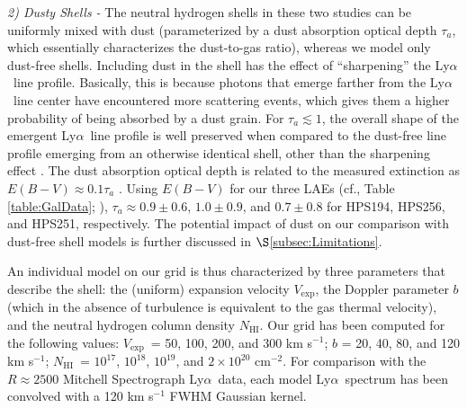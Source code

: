 \documentclass{emulateapj}
\newcommand{\lya}{Ly$\alpha$}
\def\nh{$N_{\mathrm{HI}}$}
\def\vexp{$V_{\mathrm{exp}}$}
\begin{document}
\textit{2) Dusty Shells -} The neutral hydrogen shells in these two studies can be uniformly mixed with dust (parameterized by a dust absorption optical depth $\tau_{a}$, which essentially characterizes the dust-to-gas ratio), whereas we model only dust-free shells. Including dust in the shell has the effect of ``sharpening'' the \lya\ line profile. Basically, this is because photons that emerge farther from the \lya\ line center have encountered more scattering events, which gives them a higher probability of being absorbed by a dust grain. For $\tau_{a} \lesssim 1$, the overall shape of the emergent \lya\ line profile is well preserved when compared to the dust-free line profile emerging from an otherwise identical shell, other than the sharpening effect \citep{verhamme2006,schaerer2011}. The dust absorption optical depth is related to the measured extinction as $E(B-V) \approx 0.1 \tau_{a}$ \citep{verhamme2006}. Using $E(B-V)$ for our three LAEs (cf., Table \ref{table:GalData}; \citealp{blanc2011}), $\tau_{a} \approx 0.9\pm0.6$, $1.0\pm0.9$, and $0.7\pm0.8$ for HPS194, HPS256, and HPS251, respectively. The potential impact of dust on our comparison with dust-free shell models is further discussed in $\S$\ref{subsec:Limitations}.

An individual model on our grid is thus characterized by three parameters that describe the shell: the (uniform) expansion velocity \vexp, the Doppler parameter $b$ (which in the absence of turbulence is equivalent to the gas thermal velocity), and the neutral hydrogen column density \nh. Our grid has been computed for the following values: \vexp\ = 50, 100, 200, and 300 km s$^{-1}$; $b$ = 20, 40, 80, and 120 km s$^{-1}$; \nh\ = $10^{17}$, $10^{18}$, $10^{19}$, and $2\times10^{20}$ cm$^{-2}$. For comparison with the $R\approx2500$ Mitchell Spectrograph \lya\ data, each model \lya\ spectrum has been convolved with a 120 km s$^{-1}$ FWHM Gaussian kernel. 
\end{document}
